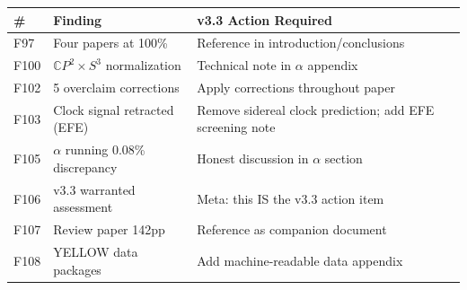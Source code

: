 \documentclass[11pt,a4paper]{article}
\begin{document}
\begin{longtable}{|p{0.6cm}|p{4cm}|p{9cm}|}
\hline
\textbf{\#} & \textbf{Finding} & \textbf{v3.3 Action Required} \\
\hline
F97 & Four papers at 100\% & Reference in introduction/conclusions \\
\hline
F100 & $\mathbb{C}P^2 \times S^3$ normalization & Technical note in $\alpha$ appendix \\
\hline
F102 & 5 overclaim corrections & Apply corrections throughout paper \\
\hline
F103 & Clock signal retracted (EFE) & Remove sidereal clock prediction; add EFE screening note \\
\hline
F105 & $\alpha$ running 0.08\% discrepancy & Honest discussion in $\alpha$ section \\
\hline
F106 & v3.3 warranted assessment & Meta: this IS the v3.3 action item \\
\hline
F107 & Review paper 142pp & Reference as companion document \\
\hline
F108 & YELLOW data packages & Add machine-readable data appendix \\
\hline
\end{longtable}
\end{document}
